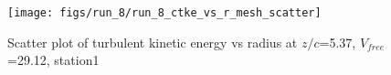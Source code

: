 \begin{figure}[H]
\centering
\texttt{[image: figs/run\_8/run\_8\_ctke\_vs\_r\_mesh\_scatter]}
\caption{Scatter plot of turbulent kinetic energy vs radius at $z/c$=5.37, $V_{free}$=29.12, station1}
\label{fig:run_8_ctke_vs_r_mesh_scatter}
\end{figure}


